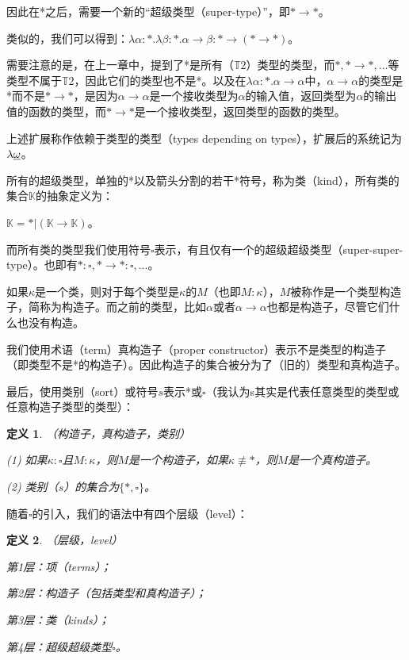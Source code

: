 \documentclass[UTF8]{article}
\newtheorem{thm}{定义}[section]
\begin{document}
		因此在*之后，需要一个新的“超级类型（super-type）”，即$*\rightarrow*$。
		
		类似的，我们可以得到：$\lambda\alpha:*.\lambda\beta:*.\alpha\rightarrow\beta:*\rightarrow(*\rightarrow*)$。
		
		需要注意的是，在上一章中，提到了*是所有（$\mathbb{T}2$）类型的类型，而$*,*\rightarrow*,...$等类型不属于$\mathbb{T}2$，因此它们的类型也不是*。以及在$\lambda\alpha:*.\alpha\rightarrow\alpha$中，$\alpha\rightarrow\alpha$的类型是*而不是$*\rightarrow*$，是因为$\alpha\rightarrow\alpha$是一个接收类型为$\alpha$的输入值，返回类型为$\alpha$的输出值的函数的类型，而$*\rightarrow*$是一个接收类型，返回类型的函数的类型。
		
		上述扩展称作依赖于类型的类型（types depending on types），扩展后的系统记为$\lambda{\uline{\omega}}$。
			
		所有的超级类型，单独的*以及箭头分割的若干*符号，称为类（kind），所有类的集合$\mathbb{K}$的抽象定义为：
		
		$\mathbb{K}=*|(\mathbb{K}\rightarrow\mathbb{K})$。
		
		而所有类的类型我们使用符号$\square$表示，有且仅有一个的超级超级类型（super-super-type）。也即有$*:\square,*\rightarrow*:\square,...$。
		
		如果$\kappa$是一个类，则对于每个类型是$\kappa$的$M$（也即$M:\kappa$），$M$被称作是一个类型构造子，简称为构造子。而之前的类型，比如$\alpha$或者$\alpha\rightarrow\alpha$也都是构造子，尽管它们什么也没有构造。
		
		我们使用术语（term）真构造子（proper constructor）表示不是类型的构造子（即类型不是*的构造子）。因此构造子的集合被分为了（旧的）类型和真构造子。
		
		最后，使用类别（sort）或符号$s$表示*或$\square$（我认为s其实是代表任意类型的类型或任意构造子类型的类型）：
		
		\begin{thm}（构造子，真构造子，类别）
			
			(1) 如果$\kappa:\square$且$M:\kappa$，则$M$是一个构造子，如果$\kappa\not\equiv*$，则$M$是一个真构造子。
			
			(2) 类别（$s$）的集合为$\{*,\square\}$。
		\end{thm}
	
		随着$\square$的引入，我们的语法中有四个层级（level）：
		
		\begin{thm}（层级，level）
			
			第1层：项（terms）；
			
			第2层：构造子（包括类型和真构造子）；
			
			第3层：类（kinds）；
			
			第4层：超级超级类型$\square$。
		\end{thm}
	
\end{document}
